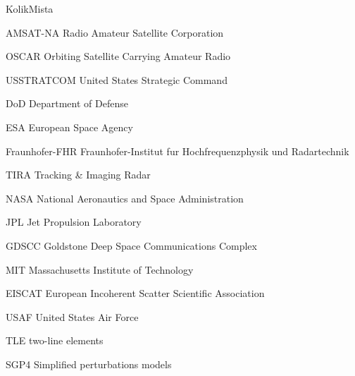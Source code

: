 \begin{seznamzkratek}{KolikMista}

      {AMSAT-NA}                             %
      {Radio Amateur Satellite Corporation}  %

      {OSCAR}
      {Orbiting Satellite Carrying Amateur Radio}

      {USSTRATCOM}
      {United States Strategic Command}

      {DoD}
      {Department of Defense}

      {ESA}
      {European Space Agency}

      {Fraunhofer-FHR}
      {Fraunhofer-Institut fur Hochfrequenzphysik und Radartechnik}

      {TIRA}
      {Tracking \& Imaging Radar}

      {NASA}
      {National Aeronautics and Space Administration}

      {JPL}
      {Jet Propulsion Laboratory}

      {GDSCC}
      {Goldstone Deep Space Communications Complex}

      {MIT}
      {Massachusetts Institute of Technology}

      {EISCAT}
      {European Incoherent Scatter Scientific Association}

      {USAF}
      {United States Air Force}

      {TLE}
      {two-line elements}

      {SGP4}
      {Simplified perturbations models}



\end{seznamzkratek}

